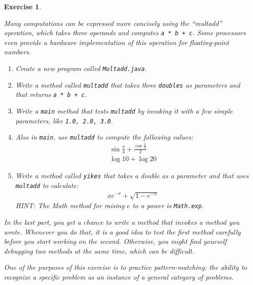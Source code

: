 \documentclass[12pt]{book}
\theoremstyle{exercise}
\newtheorem{exercise}{Exercise}[chapter]
\newcommand{\java}[1]{\verb"#1"}
\newcommand{\java}[1]{\lstinline{#1}} %
\begin{document}
\begin{exercise}
\label{ex.multadd}

Many computations can be expressed more concisely using the ``multadd'' operation, which takes three operands and computes \java{a * b + c}.
Some processors even provide a hardware implementation of this operation for floating-point numbers.

\begin{enumerate}

\item Create a new program called {\tt Multadd.java}.

\item Write a method called \java{multadd} that takes three \java{doubles} as parameters and that returns \java{a * b + c}.

\item Write a \java{main} method that tests \java{multadd} by invoking it with a few simple parameters, like \java{1.0, 2.0, 3.0}.

\item Also in \java{main}, use \java{multadd} to compute the following values:
%
\begin{eqnarray*}
& \sin \frac{\pi}{4} + \frac{\cos \frac{\pi}{4}}{2} & \\
& \log 10 + \log 20 &
\end{eqnarray*}

\item Write a method called \java{yikes} that takes a double as a parameter and that uses \java{multadd} to calculate:
%
\begin{eqnarray*}
x e^{-x} + \sqrt{1 - e^{-x}}
\end{eqnarray*}
%
HINT: The Math method for raising $e$ to a power is \java{Math.exp}.

\end{enumerate}

In the last part, you get a chance to write a method that invokes a method you wrote.
Whenever you do that, it is a good idea to test the first method carefully before you start working on the second.
Otherwise, you might find yourself debugging two methods at the same time, which can be difficult.

One of the purposes of this exercise is to practice pattern-matching: the ability to recognize a specific problem as an instance of a general category of problems.

\end{exercise}
\end{document}
